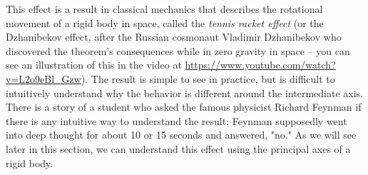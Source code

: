 This effect is a result in classical mechanics that describes the rotational movement of a rigid body in space, called the \emph{tennis racket effect} (or the Dzhanibekov effect, after the Russian cosmonaut Vladimir Dzhanibekov who discovered the theorem's consequences while in zero gravity in space -- you can see an illustration of this in the video at \url{https://www.youtube.com/watch?v=L2o9eBl_Gzw}). The result is simple to see in practice, but is difficult to intuitively understand why the behavior is different around the intermediate axis. There is a story of a student who asked the famous physicist Richard Feynman if there is any intuitive way to understand the result; Feynman supposedly went into deep thought for about 10 or 15 seconds and answered, "no." As we will see later in this section, we can understand this effect using the principal axes of a rigid body. 

\label{sec:pat_intro}


